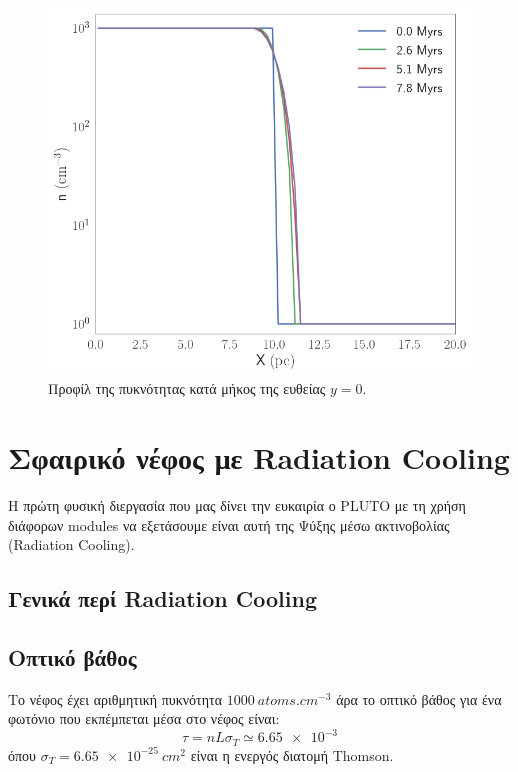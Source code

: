 \documentclass[article,a4paper,11.2pt]{memoir}
\numberwithin{equation}{subsection}
\begin{document}
 
\begin{figure}[h]
	\centering
	\includegraphics[width=1.0\linewidth]{DataImages/NoCoolingRHOprofile}
	\caption{Προφίλ της πυκνότητας κατά μήκος της ευθείας $y=0$.}
	\label{fig:nocoolingrhoprofile}
\end{figure}
	
	\section{Σφαιρικό νέφος με Radiation Cooling}
		
	Η πρώτη φυσική διεργασία που μας δίνει την ευκαιρία ο PLUTO με τη χρήση διάφορων modules να εξετάσουμε είναι αυτή της Ψύξης μέσω ακτινοβολίας (Radiation Cooling).
	
	\subsection{Γενικά περί Radiation Cooling}

	\subsection{Οπτικό βάθος}
	Το νέφος έχει αριθμητική πυκνότητα $\SI{1000}{atoms.cm^{-3}}$ άρα το οπτικό βάθος
	για ένα φωτόνιο που εκπέμπεται μέσα στο νέφος είναι:
	\begin{equation}
	\tau = nL\sigma _T\simeq \num{6.65e-3}
	\end{equation}
	όπου $\sigma _T = \SI{6.65e-25}{cm^2}$ είναι η ενεργός διατομή Thomson.
	
\end{document}
